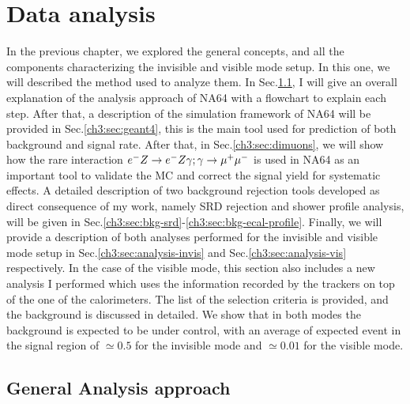 
\newcommand{\pdirthree}{chapters/plots/chapter3}

\chapter{Data analysis} %
\label{chapter3} %


In the previous chapter, we explored the general concepts, and all the components characterizing the invisible and visible mode setup. In this one, we will described the method used to analyze them. In Sec.\ref{ch3:sec:analysis-approach}, I will give an overall explanation of the analysis approach of NA64 with a flowchart to explain each step. After that, a description of the simulation framework of NA64 will be provided in Sec.\ref{ch3:sec:geant4}, this is the main tool used for prediction of both background and signal rate.
After that, in Sec.\ref{ch3:sec:dimuons}, we will show how the rare interaction $e^- Z \to e^- Z \gamma; \gamma \to \mu^+ \mu^-$ is used in NA64 as an important tool to validate the MC and correct the signal yield for systematic effects.
A detailed description of two background rejection tools developed as direct consequence of my work, namely SRD rejection and shower profile analysis, will be given in Sec.\ref{ch3:sec:bkg-srd}-\ref{ch3:sec:bkg-ecal-profile}.
Finally, we will provide a description of both analyses performed for the invisible and visible mode setup in Sec.\ref{ch3:sec:analysis-invis} and Sec.\ref{ch3:sec:analysis-vis} respectively. In the case of the visible mode, this section also includes a new analysis I performed which uses the information recorded by the trackers on top of the one of the calorimeters.
The list of the selection criteria is provided, and the background is discussed in detailed. We show that in both modes the background is expected to be under control, with an average of expected event in the signal region of $\simeq 0.5$ for the invisible mode and $\simeq 0.01$ for the visible mode.


\section{General Analysis approach}
\label{ch3:sec:analysis-approach}


